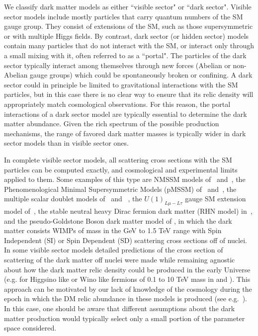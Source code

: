  We classify dark matter models as either ``visible sector" or ``dark sector".
 Visible sector models include mostly particles that carry quantum numbers of the SM gauge group. They consist of extensions of the SM,  such as those supersymmetric or with multiple Higgs fields. By contrast, dark sector (or hidden sector) models contain many particles that do not interact with the SM, or interact only through a small mixing with it, often referred to as a ``portal".  The particles of the dark sector typically interact among themselves through new forces (Abelian or non-Abelian gauge groups) which could be spontaneously broken or confining.
 A dark sector could in principle be limited to gravitational interactions with the SM particles, but in this case there is no clear way to ensure that its relic density will appropriately match cosmological observations.  For this reason, the
 portal interactions of a dark sector model are typically essential to determine the dark matter abundance. Given the rich spectrum of the possible production mechanisms, the range of favored dark matter masses is typically wider in dark sector models than in visible sector ones. 
 
 In complete visible sector models, all scattering cross sections with the SM particles can be computed exactly, and cosmological and experimental limits applied to them. Some examples of this type are NMSSM models of~\cite{Lopez-Fogliani:2021qpq} and~\cite{Wang:2020xta}, the Phenomenological Minimal Supersymmetric Models (pMSSM) of~\cite{VanBeekveld:2021tgn} and~\cite{Mukherjee:2022kff}, the multiple scalar doublet models of~\cite{Cabrera:2019gaq} and ~\cite{Khater:2021wcx}, the $U(1)_{L\mu -L\tau}$ gauge SM extension model of~\cite{Singirala:2021gok}, the stable neutral heavy Dirac fermion dark matter (RHN model) in~\cite{Barger:2008qd}, 
 and the pseudo-Goldstone Boson dark matter model of \cite{Alanne:2020jwx}, in which the dark matter consists WIMPs of mass in the GeV to 1.5 TeV range with Spin Independent (SI) or Spin Dependent (SD)  scattering  cross sections off of nuclei.  
 In some visible sector models detailed predictions of the cross section of scattering of the dark matter off nuclei were made while remaining agnostic about how the dark matter relic density could be produced in the early Universe (e.g. for Higgsino like or Wino like fermions of 0.1 to 10 TeV mass in \cite{Chen:2018uqz} and \cite{Chen:2019gtm}). This approach can be motivated by our lack of knowledge of the cosmology during the epoch in which the DM relic abundance in these models is produced (see e.g.~\cite{Gelmini:2006pw, Gelmini:2006pq, Gelmini:2006mr, Berger:2020maa, Dienes:2021woi, Howard:2021ohe}).  In this case, one should be aware that different assumptions about the dark matter production would typically select only a small portion of the parameter space considered.
 
